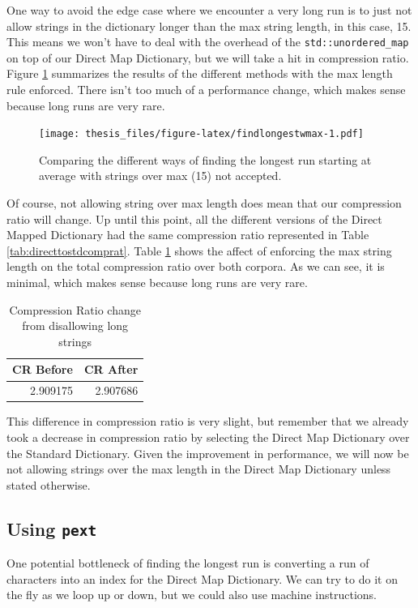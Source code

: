\documentclass[12pt,twoside]{reedthesis}
\begin{document}
One way to avoid the edge case where we encounter a very long run is to just not allow strings in the dictionary longer than the max string length, in this case, 15. This means we won't have to deal with the overhead of the \texttt{std::unordered\_map} on top of our Direct Map Dictionary, but we will take a hit in compression ratio. Figure \ref{fig:findlongestwmax} summarizes the results of the different methods with the max length rule enforced. There isn't too much of a performance change, which makes sense because long runs are very rare.
\begin{figure}
\centering
\texttt{[image: thesis\_files/figure-latex/findlongestwmax-1.pdf]}
\caption{\label{fig:findlongestwmax}Comparing the different ways of finding the longest run starting at average with strings over max (15) not accepted.}
\end{figure}
Of course, not allowing string over max length does mean that our compression ratio will change. Up until this point, all the different versions of the Direct Mapped Dictionary had the same compression ratio represented in Table \ref{tab:directtostdcomprat}. Table \ref{tab:maxenforcedstats} shows the affect of enforcing the max string length on the total compression ratio over both corpora. As we can see, it is minimal, which makes sense because long runs are very rare.
\begin{table}

\caption{\label{tab:maxenforcedstats}Compression Ratio change from disallowing long strings}
\centering
\begin{tabular}[t]{rr}
\toprule
CR Before & CR After\\
\midrule
2.909175 & 2.907686\\
\bottomrule
\end{tabular}
\end{table}
This difference in compression ratio is very slight, but remember that we already took a decrease in compression ratio by selecting the Direct Map Dictionary over the Standard Dictionary. Given the improvement in performance, we will now be not allowing strings over the max length in the Direct Map Dictionary unless stated otherwise.

\hypertarget{using-pext}{%
\subsection{\texorpdfstring{Using \texttt{pext}}{Using pext}}\label{using-pext}}

One potential bottleneck of finding the longest run is converting a run of characters into an index for the Direct Map Dictionary. We can try to do it on the fly as we loop up or down, but we could also use machine instructions.
\end{document}
